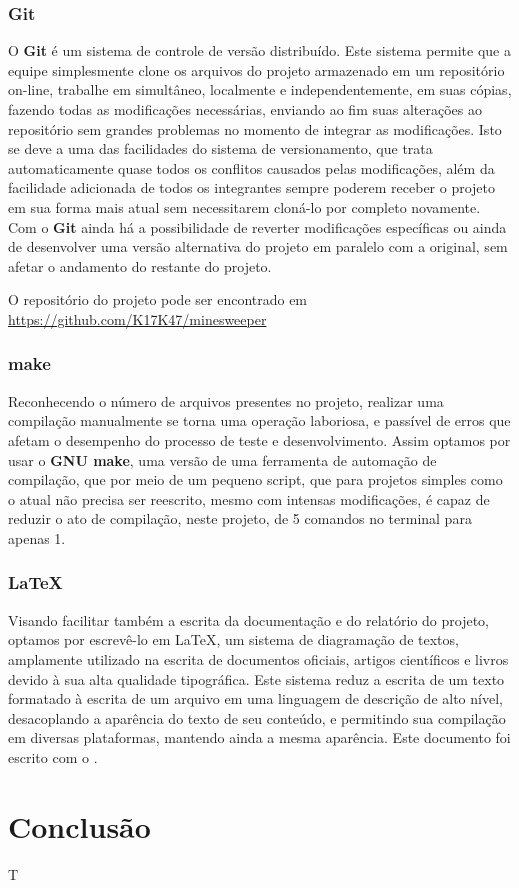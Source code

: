 \documentclass[10pt,a4paper]{report}
\begin{document}
\subsection{Git}
O \textbf{Git} é um sistema de controle de versão distribuído. Este sistema permite que a equipe simplesmente clone os arquivos do projeto armazenado em um repositório on-line, trabalhe em simultâneo, localmente e independentemente, em suas cópias, fazendo todas as modificações necessárias, enviando ao fim suas alterações ao repositório sem grandes problemas no momento de integrar as modificações. Isto se deve a uma das facilidades do sistema de versionamento, que trata automaticamente quase todos os conflitos causados pelas modificações, além da facilidade adicionada de todos os integrantes sempre poderem receber o projeto em sua forma mais atual sem necessitarem cloná-lo por completo novamente. Com o \textbf{Git} ainda há a possibilidade de reverter modificações específicas ou ainda de desenvolver uma versão alternativa do projeto em paralelo com a original, sem afetar o andamento do restante do projeto.

O repositório do projeto pode ser encontrado em \url{https://github.com/K17K47/minesweeper}

\subsection{make}
Reconhecendo o número de arquivos presentes no projeto, realizar uma compilação manualmente se torna uma operação laboriosa, e passível de erros que afetam o desempenho do processo de teste e desenvolvimento. Assim optamos por usar o \textbf{GNU make}, uma versão de uma ferramenta de automação de compilação, que por meio de um pequeno script, que para projetos simples como o atual não precisa ser reescrito, mesmo com intensas modificações, é capaz de reduzir o ato de compilação, neste projeto, de 5 comandos no terminal para apenas 1.

\subsection{\LaTeX}
Visando facilitar também a escrita da documentação e do relatório do projeto, optamos por escrevê-lo em \LaTeX, um sistema de diagramação de textos, amplamente utilizado na escrita de documentos oficiais, artigos científicos e livros devido à sua alta qualidade tipográfica. Este sistema reduz a escrita de um texto formatado à escrita de um arquivo em uma linguagem de descrição de alto nível, desacoplando a aparência do texto de seu conteúdo, e permitindo sua compilação em diversas plataformas, mantendo ainda a mesma aparência. Este documento foi escrito com o \LaTeXe.

\chapter{Conclusão}
T
\end{document}
